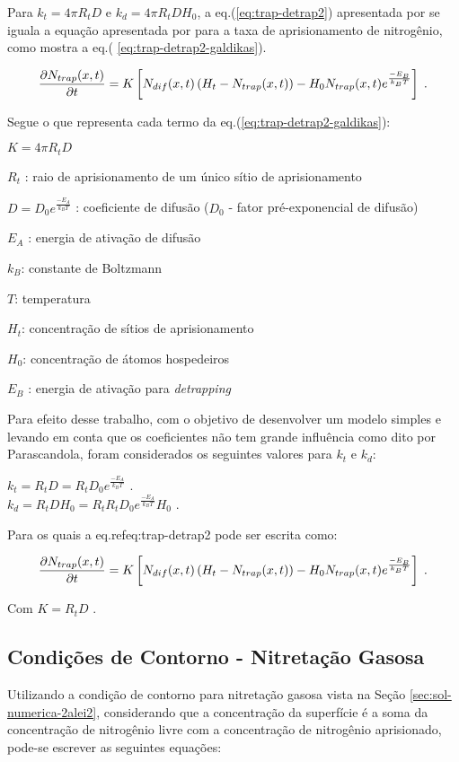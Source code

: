 Para $k_t = 4{\pi}R_tD$ e $k_d = 4{\pi}R_tDH_0$, a eq.(\ref{eq:trap-detrap2}) apresentada por \cite{parascandola2000nitrogen} se iguala a equação apresentada por \cite{moskalioviene2011modeling} para a taxa de aprisionamento de nitrogênio, como mostra a eq.( \ref{eq:trap-detrap2-galdikas}).

\begin{equation}
\label{eq:trap-detrap2-galdikas}
\pdv{N_{trap}(x,t)}{t} = K\left[N_{dif}(x,t)\left(H_t-N_{trap}(x,t)\right) - H_0 N_{trap}(x,t)e^{\frac{-E_B}{k_BT}}\right]  \;.
\end{equation}

Segue o que representa cada termo da eq.(\ref{eq:trap-detrap2-galdikas}):

$K=4{\pi}R_tD$

$R_t$ : raio de aprisionamento de um único sítio de aprisionamento

$D=D_0e^{\frac{-E_A}{k_BT}}$ : coeficiente de difusão ($D_0$ - fator pré-exponencial de difusão)

$E_A$ : energia de ativação de difusão

$k_B$: constante de Boltzmann 
	
$T$: temperatura

$H_t$: concentração de sítios de aprisionamento

$H_0$: concentração de átomos hospedeiros
	
$E_B$ : energia de ativação para \textit{detrapping}

Para efeito desse trabalho, com o objetivo de desenvolver um modelo simples e levando em conta que os coeficientes não tem grande influência como dito por Parascandola, foram considerados os seguintes valores para $k_t$ e $k_d$:
\begin{center}
$k_t = R_tD = R_tD_0e^{\frac{-E_A}{k_BT}}$ \;. \\ $k_d = R_tDH_0 = R_tR_tD_0e^{\frac{-E_A}{k_BT}}H_0$ \;.
\end{center}

Para os quais a eq.ref{eq:trap-detrap2} pode ser escrita como:

\begin{equation}
\label{eq:trap-detrap2-me}
\pdv{N_{trap}(x,t)}{t} = K\left[N_{dif}(x,t)\left(H_t-N_{trap}(x,t)\right) - H_0 N_{trap}(x,t)e^{\frac{-E_B}{k_BT}}\right] \;.
\end{equation}

Com $K=R_tD$ .

\subsection{Condições de Contorno - Nitretação Gasosa}
\label{sec:trap-detrap-gas-cc}
Utilizando a condição de contorno para nitretação gasosa vista na Seção \ref{sec:sol-numerica-2alei2}, considerando que a concentração da superfície é a soma da concentração de nitrogênio livre com a concentração de nitrogênio aprisionado, pode-se escrever as seguintes equações:

